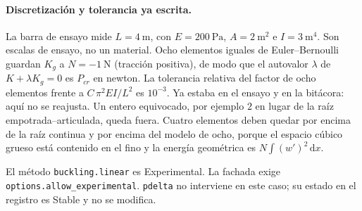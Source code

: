 \paragraph{Discretización y tolerancia ya escrita.}
La barra de ensayo mide \(L=4~\mathrm{m}\), con \(E=200~\mathrm{Pa}\), \(A=2~\mathrm{m}^2\) e \(I=3~\mathrm{m}^4\). Son escalas de ensayo, no un material. Ocho elementos iguales de Euler--Bernoulli guardan \(K_g\) a \(N=-1~\mathrm{N}\) (tracción positiva), de modo que el autovalor \(\lambda\) de \(K+\lambda K_g=0\) es \(P_{cr}\) en newton. La tolerancia relativa del factor de ocho elementos frente a \(C\,\pi^2 EI/L^2\) es \(10^{-3}\). Ya estaba en el ensayo y en la bitácora: aquí no se reajusta. Un entero equivocado, por ejemplo \(2\) en lugar de la raíz empotrada--articulada, queda fuera. Cuatro elementos deben quedar por encima de la raíz continua y por encima del modelo de ocho, porque el espacio cúbico grueso está contenido en el fino y la energía geométrica es \(N\int (w')^2\,\mathrm{d}x\).

El método \texttt{buckling.linear} es Experimental. La fachada exige \texttt{options.allow\_experimental}. \texttt{pdelta} no interviene en este caso; su estado en el registro es Stable y no se modifica.
